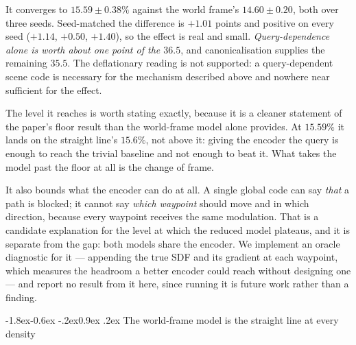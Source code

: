 \documentclass[10pt,twocolumn,letterpaper]{article}
\makeatletter
\renewcommand\subsection{\@startsection{subsection}{2}{\z@}%
  {-1.8ex\@plus -0.6ex \@minus -.2ex}{0.9ex \@plus .2ex}%
  {\normalfont\normalsize\bfseries}}
\theoremstyle{plain}
\makeatother
\begin{document}
It converges to $15.59\pm0.38\%$ against the world frame's $14.60\pm0.20$, both
over three seeds. Seed-matched the difference is $+1.01$ points and positive on
every seed ($+1.14$, $+0.50$, $+1.40$), so the effect is real and small.
\emph{Query-dependence alone is worth about one point of the $36.5$}, and
canonicalisation supplies the remaining $35.5$. The deflationary reading is not
supported: a query-dependent scene code is necessary for the mechanism described
above and nowhere near sufficient for the effect.

The level it reaches is worth stating exactly, because it is a cleaner statement
of the paper's floor result than the world-frame model alone provides. At
$15.59\%$ it lands on the straight line's $15.6\%$, not above it: giving the
encoder the query is enough to reach the trivial baseline and not enough to beat
it. What takes the model past the floor at all is the change of frame.

It also bounds what the encoder can do at all. A single global code can say
\emph{that} a path is blocked; it cannot say \emph{which waypoint} should move
and in which direction, because every waypoint receives the same modulation. That
is a candidate explanation for the level at which the reduced model plateaus, and
it is separate from the gap: both models share the encoder. We implement an oracle
diagnostic for it --- appending the true SDF and its gradient at each waypoint,
which measures the headroom a better encoder could reach without designing one
--- and report no result from it here, since running it is future work rather
than a finding.

\subsection{The world-frame model is the straight line at every density}
\label{sec:density}
\end{document}
